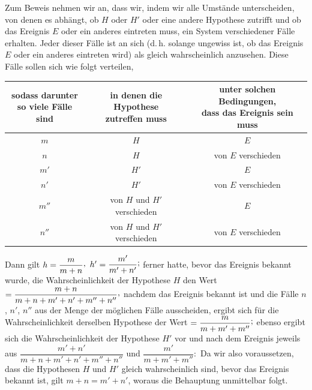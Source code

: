 Zum Beweis nehmen wir an, dass wir, indem wir alle Umstände unterscheiden, von denen es abhängt, ob $H$ oder $H'$ oder eine andere Hypothese zutrifft und ob das Ereignis $E$ oder ein anderes eintreten muss, ein System verschiedener Fälle erhalten. Jeder dieser Fälle ist an sich (d.\,h. solange ungewiss ist, ob das Ereignis $E$ oder ein anderes eintreten wird) als gleich wahrscheinlich anzusehen. Diese Fälle sollen sich wie folgt verteilen,
\begin{center}
\small
\begin{tabular}{c|c|c}
\shortstack{sodass darunter\\so viele Fälle sind} & \shortstack{in denen die Hypothese\\zutreffen muss} & \shortstack{unter solchen Bedingungen,\\dass das Ereignis sein muss} \\
\hline
$m$ & $H$ & $E$ \\
$n$ & $H$ & von $E$ verschieden \\
$m'$ & $H'$ & $E$ \\
$n'$ & $H'$ & von $E$ verschieden \\
$m''$ & von $H$ und $H'$ verschieden & $E$ \\
$n''$ & von $H$ und $H'$ verschieden & von $E$ verschieden
\end{tabular}
\end{center}
Dann gilt $h=\dfrac{m}{m+n}\mathpunct{\raisebox{.45ex}{,}}$ $h'=\dfrac{m'}{m'+n'}\mathpunct{\raisebox{.45ex}{;}}$ ferner hatte, bevor das Ereignis bekannt wurde, die Wahrscheinlichkeit der Hypothese $H$ den Wert $=\dfrac{m+n}{m+n+m'+n'+m''+n''}\mathpunct{\raisebox{.45ex}{,}}$ nachdem das Ereignis bekannt ist und die Fälle $n$, $n'$, $n''$ aus der Menge der möglichen Fälle ausscheiden, ergibt sich für die Wahrscheinlichkeit derselben Hypothese der Wert $=\dfrac{m}{m+m'+m''}\mathpunct{\raisebox{.45ex}{;}}$ ebenso ergibt sich die Wahrscheinlichkeit der Hypothese $H'$ vor und nach dem Ereignis jeweils aus $\dfrac{m'+n'}{m+n+m'+n'+m''+n''}$ und $\dfrac{m'}{m+m'+m''}\mathpunct{:}$ Da wir also voraussetzen, dass die Hypothesen $H$ und $H'$ gleich wahrscheinlich sind, bevor das Ereignis bekannt ist, gilt $m+n=m'+n'$, woraus die Behauptung unmittelbar folgt.

